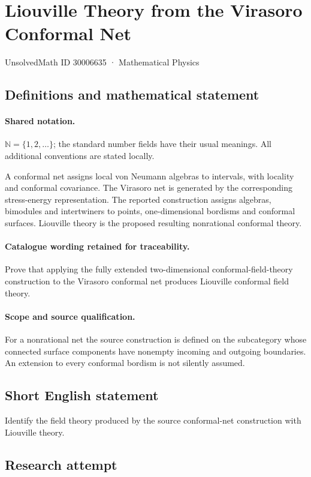 \documentclass[11pt]{article}
\begin{document}
\setcounter{section}{30006634}
\section{Liouville Theory from the Virasoro Conformal Net}\label{30006635}
{\small UnsolvedMath ID 30006635 · Mathematical Physics}
\subsection{Definitions and mathematical statement}

\paragraph{Shared notation.}$\mathbb N=\{1,2,\ldots\}$; the standard number fields have their usual meanings. All additional conventions are stated locally.


A conformal net assigns local von Neumann algebras to intervals, with locality and conformal covariance. The Virasoro net is generated by the corresponding stress-energy representation. The reported construction assigns algebras, bimodules and intertwiners to points, one-dimensional bordisms and conformal surfaces. Liouville theory is the proposed resulting nonrational conformal theory.

\paragraph{Catalogue wording retained for traceability.}
Prove that applying the fully extended two-dimensional conformal-field-theory construction to the Virasoro conformal net produces Liouville conformal field theory.

\paragraph{Scope and source qualification.}For a nonrational net the source construction is defined on the subcategory whose connected surface components have nonempty incoming and outgoing boundaries. An extension to every conformal bordism is not silently assumed.
\subsection{Short English statement}
Identify the field theory produced by the source conformal-net construction with Liouville theory.
\subsection{Research attempt}
\end{document}
